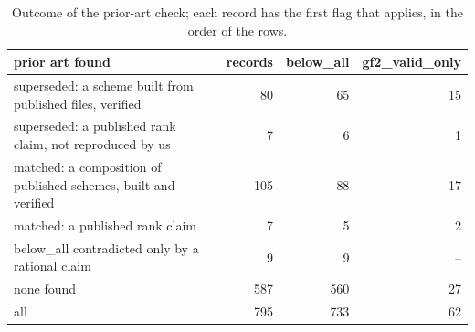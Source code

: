 \begin{table}[t]
\centering\small
\begin{tabular}{@{}lrrr@{}}
\toprule
prior art found & records & \textsf{below\_all} & \textsf{gf2\_valid\_only}\\
\midrule
superseded: a scheme built from published files, verified & 80 & 65 & 15\\
superseded: a published rank claim, not reproduced by us & 7 & 6 & 1\\
matched: a composition of published schemes, built and verified & 105 & 88 & 17\\
matched: a published rank claim & 7 & 5 & 2\\
\textsf{below\_all} contradicted only by a rational claim & 9 & 9 & --\\
none found & 587 & 560 & 27\\
\midrule
all & 795 & 733 & 62\\
\bottomrule
\end{tabular}
\caption{Outcome of the prior-art check; each record has the first flag that applies, in the order of the rows.}
\label{tab:priorart}
\end{table}

